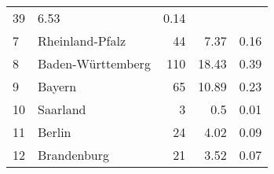 \begin{longtable}{lXrrr}
       \num{39} &
       \num[round-mode=places,round-precision=2]{6.53} &
         \num[round-mode=places,round-precision=2]{0.14} \\

     7 &
     \multicolumn{1}{X}{ Rheinland-Pfalz   } &


       \num{44} &
       \num[round-mode=places,round-precision=2]{7.37} &
         \num[round-mode=places,round-precision=2]{0.16} \\

     8 &
     \multicolumn{1}{X}{ Baden-Württemberg   } &


       \num{110} &
       \num[round-mode=places,round-precision=2]{18.43} &
         \num[round-mode=places,round-precision=2]{0.39} \\

     9 &
     \multicolumn{1}{X}{ Bayern   } &


       \num{65} &
       \num[round-mode=places,round-precision=2]{10.89} &
         \num[round-mode=places,round-precision=2]{0.23} \\

     10 &
     \multicolumn{1}{X}{ Saarland   } &


       \num{3} &
       \num[round-mode=places,round-precision=2]{0.5} &
         \num[round-mode=places,round-precision=2]{0.01} \\

     11 &
     \multicolumn{1}{X}{ Berlin   } &


       \num{24} &
       \num[round-mode=places,round-precision=2]{4.02} &
         \num[round-mode=places,round-precision=2]{0.09} \\

     12 &
     \multicolumn{1}{X}{ Brandenburg   } &


       \num{21} &
       \num[round-mode=places,round-precision=2]{3.52} &
         \num[round-mode=places,round-precision=2]{0.07} \\


\end{longtable}
